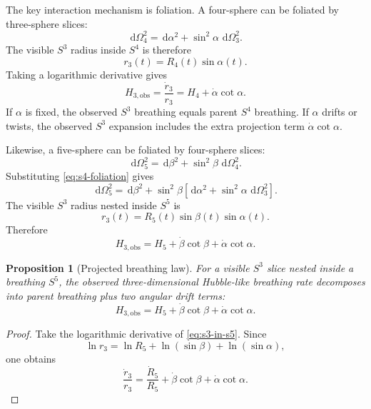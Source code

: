 \documentclass[11pt]{article}
\newtheorem{proposition}{Proposition}
\newcommand{\dd}{\,\mathrm{d}}
\begin{document}
The key interaction mechanism is foliation.  A four-sphere can be foliated by three-sphere slices:
\begin{equation}
 \dd\Omega_4^2=\dd\alpha^2+\sin^2\alpha\,\dd\Omega_3^2.
 \label{eq:s4-foliation}
\end{equation}
The visible $S^3$ radius inside $S^4$ is therefore
\begin{equation}
 r_3(t)=R_4(t)\sin\alpha(t).
 \label{eq:s3-in-s4}
\end{equation}
Taking a logarithmic derivative gives
\begin{equation}
 \boxed{
 H_{3,\mathrm{obs}}=\frac{\dot r_3}{r_3}=H_4+\dot\alpha\cot\alpha.
 }
 \label{eq:s4-observed-h}
\end{equation}
If $\alpha$ is fixed, the observed $S^3$ breathing equals parent $S^4$ breathing.  If $\alpha$ drifts or twists, the observed $S^3$ expansion includes the extra projection term $\dot\alpha\cot\alpha$.

Likewise, a five-sphere can be foliated by four-sphere slices:
\begin{equation}
 \dd\Omega_5^2=\dd\beta^2+\sin^2\beta\,\dd\Omega_4^2.
 \label{eq:s5-foliation}
\end{equation}
Substituting \eqref{eq:s4-foliation} gives
\begin{equation}
 \dd\Omega_5^2
 =\dd\beta^2+\sin^2\beta
 \left[\dd\alpha^2+\sin^2\alpha\,\dd\Omega_3^2\right].
\end{equation}
The visible $S^3$ radius nested inside $S^5$ is
\begin{equation}
 r_3(t)=R_5(t)\sin\beta(t)\sin\alpha(t).
 \label{eq:s3-in-s5}
\end{equation}
Therefore
\begin{equation}
 \boxed{
 H_{3,\mathrm{obs}}=H_5+\dot\beta\cot\beta+\dot\alpha\cot\alpha.
 }
 \label{eq:s5-observed-h}
\end{equation}

\begin{proposition}[Projected breathing law]
For a visible $S^3$ slice nested inside a breathing $S^5$, the observed three-dimensional Hubble-like breathing rate decomposes into parent breathing plus two angular drift terms:
\begin{equation}
H_{3,\mathrm{obs}}=H_5+\dot\beta\cot\beta+\dot\alpha\cot\alpha.
\end{equation}
\end{proposition}

\begin{proof}
Take the logarithmic derivative of \eqref{eq:s3-in-s5}.  Since
\begin{equation}
 \ln r_3=\ln R_5+\ln(\sin\beta)+\ln(\sin\alpha),
\end{equation}
one obtains
\begin{equation}
 \frac{\dot r_3}{r_3}=\frac{\dot R_5}{R_5}+\dot\beta\cot\beta+\dot\alpha\cot\alpha.
\end{equation}
\end{proof}
\end{document}
